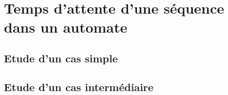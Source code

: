 \section{Temps d’attente d’une séquence dans un automate}


\subsection{Etude d’un cas simple}


\subsection{Etude d’un cas intermédiaire}

